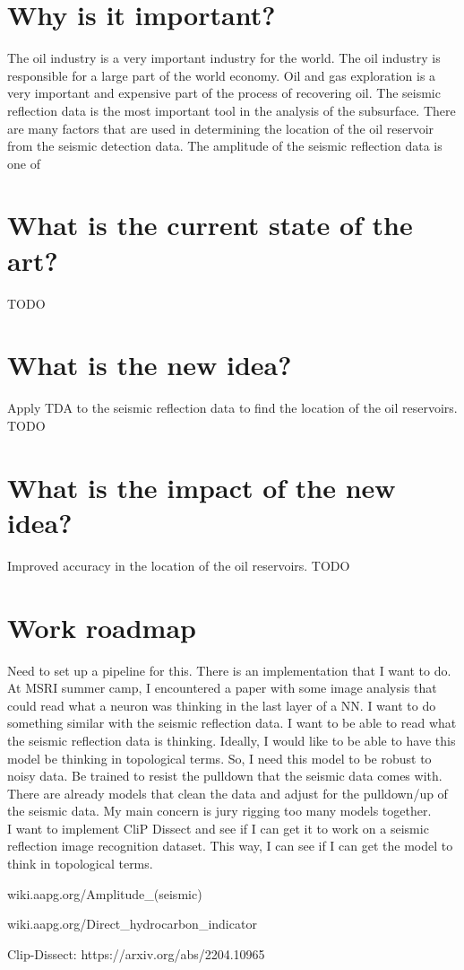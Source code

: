 \documentclass{article}
\begin{document}
\section{Why is it important?}

The oil industry is a very important industry for the world. The oil industry is responsible for a
large part of the world economy. Oil and gas exploration is a very important and expensive part of
the process of recovering oil. The seismic reflection data is the most important tool in the
analysis of the subsurface. There are many factors that are used in determining the location of the
oil reservoir from the seismic detection data. The amplitude of the seismic reflection data is one
of


\section{What is the current state of the art?}

TODO

\section{What is the new idea?}

Apply TDA to the seismic reflection data to find the location of the oil reservoirs. TODO

\section{What is the impact of the new idea?}

Improved accuracy in the location of the oil reservoirs. TODO

\section{Work roadmap}

Need to set up a pipeline for this. There is an implementation that I want to do. At MSRI summer
camp, I encountered a paper with some image analysis that could read what a neuron was thinking in
the last layer of a NN. I want to do something similar with the seismic reflection data. I want to
be able to read what the seismic reflection data is thinking. Ideally, I would like to be able to
have this model be thinking in topological terms. So, I need this model to be robust to noisy data.
Be trained to resist the pulldown that the seismic data comes with. There are already models that
clean the data and adjust for the pulldown/up of the seismic data. My main concern is jury rigging
too many models together. \\ I want to implement CliP Dissect and see if I can get it to work on a
seismic reflection image recognition dataset. This way, I can see if I can get the model to think in
topological terms.





wiki.aapg.org/Amplitude_(seismic)

wiki.aapg.org/Direct_hydrocarbon_indicator

Clip-Dissect: https://arxiv.org/abs/2204.10965
\end{document}
